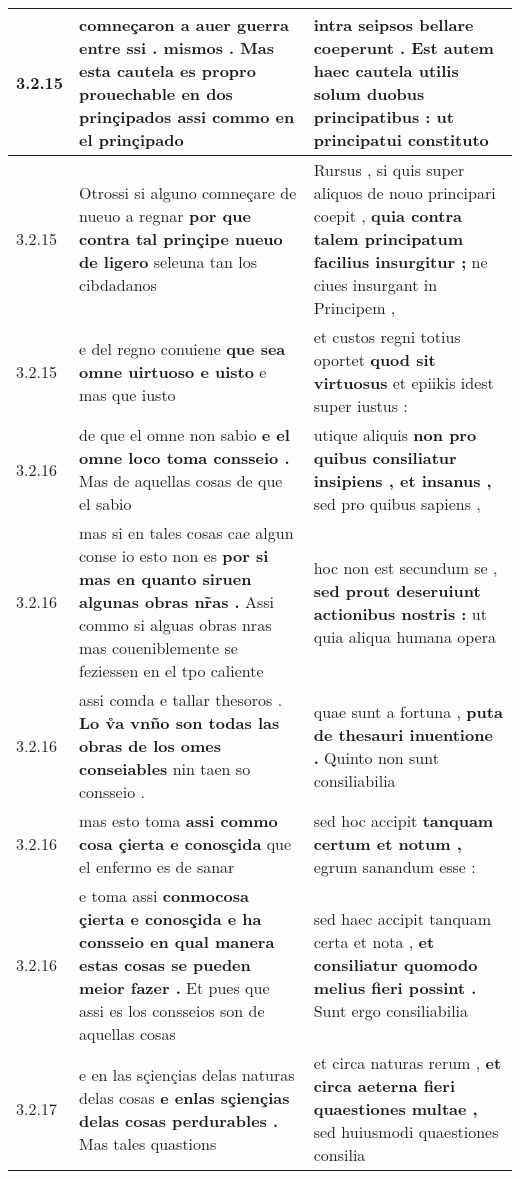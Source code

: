 \begin{tabular}{|p{1cm}|p{6.5cm}|p{6.5cm}|}
3.2.15 & comneçaron a auer guerra entre ssi . mismos . \textbf{ Mas esta cautela es propro prouechable en dos prinçipados } assi commo en el prinçipado & intra seipsos bellare coeperunt . \textbf{ Est autem haec cautela utilis solum duobus principatibus : } ut principatui constituto \\\hline
3.2.15 & Otrossi si alguno comneçare de nueuo a regnar \textbf{ por que contra tal prinçipe nueuo de ligero } seleuna tan los cibdadanos & Rursus , si quis super aliquos de nouo principari coepit , \textbf{ quia contra talem principatum facilius insurgitur ; } ne ciues insurgant in Principem , \\\hline
3.2.15 & e del regno conuiene \textbf{ que sea omne uirtuoso e uisto } e mas que iusto & et custos regni totius oportet \textbf{ quod sit virtuosus } et epiikis idest super iustus : \\\hline
3.2.16 & de que el omne non sabio \textbf{ e el omne loco toma consseio . } Mas de aquellas cosas de que el sabio & utique aliquis \textbf{ non pro quibus consiliatur insipiens , et insanus , } sed pro quibus sapiens , \\\hline
3.2.16 & mas si en tales cosas cae algun conse io esto non es \textbf{ por si mas en quanto siruen algunas obras nr̃as . } Assi commo si alguas obras nras mas coueniblemente se feziessen en el tpo caliente & hoc non est secundum se , \textbf{ sed prout deseruiunt actionibus nostris : } ut quia aliqua humana opera \\\hline
3.2.16 & assi comda e tallar thesoros . \textbf{ Lo v̊a vnño son todas las obras de los omes conseiables } nin taen so consseio . & quae sunt a fortuna , \textbf{ puta de thesauri inuentione . } Quinto non sunt consiliabilia \\\hline
3.2.16 & mas esto toma \textbf{ assi commo cosa çierta e conosçida } que el enfermo es de sanar & sed hoc accipit \textbf{ tanquam certum et notum , } egrum sanandum esse : \\\hline
3.2.16 & e toma assi \textbf{ conmocosa çierta e conosçida e ha consseio en qual manera estas cosas se pueden meior fazer . } Et pues que assi es los consseios son de aquellas cosas & sed haec accipit tanquam certa et nota , \textbf{ et consiliatur quomodo melius fieri possint . } Sunt ergo consiliabilia \\\hline
3.2.17 & e en las sçiençias delas naturas delas cosas \textbf{ e enlas sçiençias delas cosas perdurables . } Mas tales quastions & et circa naturas rerum , \textbf{ et circa aeterna fieri quaestiones multae , } sed huiusmodi quaestiones consilia \\\hline

\end{tabular}
